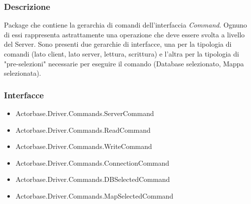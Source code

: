 \documentclass[a4paper]{article}
\begin{document}
		\subsubsection{Descrizione}
			Package che contiene la gerarchia di comandi dell'interfaccia \emph{Command}. Ognuno di essi rappresenta astrattamente una operazione che deve essere svolta a livello del Server. Sono presenti due gerarchie di interfacce, una per la tipologia di comandi (lato client, lato server, lettura, scrittura) e l'altra per la tipologia di "pre-selezioni" necessarie per eseguire il comando (Database selezionato, Mappa selezionata).
		
		\subsubsection{Interfacce}
			\begin{itemize}
				\item Actorbase.Driver.Commands.ServerCommand
				\item Actorbase.Driver.Commands.ReadCommand
				\item Actorbase.Driver.Commands.WriteCommand
				\item Actorbase.Driver.Commands.ConnectionCommand
				\item Actorbase.Driver.Commands.DBSelectedCommand
				\item Actorbase.Driver.Commands.MapSelectedCommand
			\end{itemize}
\end{document}
